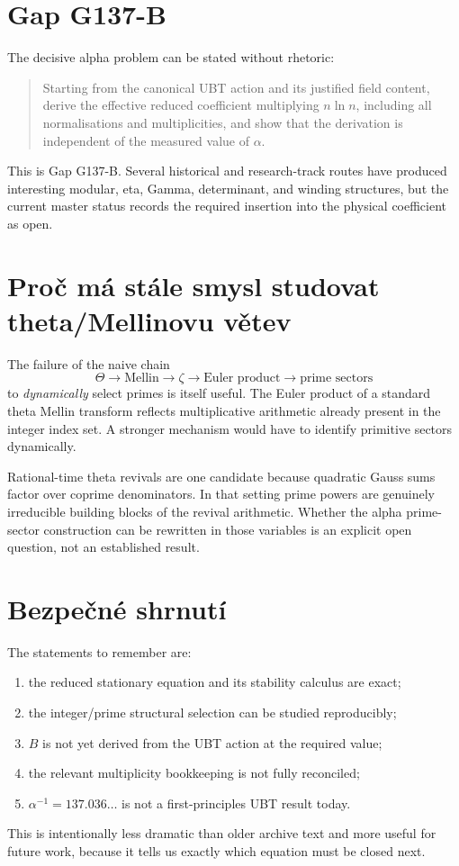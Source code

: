 \section{Gap G137-B}
The decisive alpha problem can be stated without rhetoric:
\begin{quote}
Starting from the canonical UBT action and its justified field content, derive
the effective reduced coefficient multiplying $n\ln n$, including all
normalisations and multiplicities, and show that the derivation is independent
of the measured value of $\alpha$.
\end{quote}
This is Gap G137-B.  Several historical and research-track routes have produced
interesting modular, eta, Gamma, determinant, and winding structures, but the
current master status records the required insertion into the physical
coefficient as open.

\section{Proč má stále smysl studovat theta/Mellinovu větev}
The failure of the naive chain
\[
 \Theta\to\text{Mellin}\to\zeta\to\text{Euler product}
 \to\text{prime sectors}
\]
to \emph{dynamically} select primes is itself useful.  The Euler product of a
standard theta Mellin transform reflects multiplicative arithmetic already
present in the integer index set.  A stronger mechanism would have to identify
primitive sectors dynamically.

Rational-time theta revivals are one candidate because quadratic Gauss sums
factor over coprime denominators.  In that setting prime powers are genuinely
irreducible building blocks of the revival arithmetic.  Whether the alpha
prime-sector construction can be rewritten in those variables is an explicit
open question, not an established result.

\section{Bezpečné shrnutí}
The statements to remember are:
\begin{enumerate}
 \item the reduced stationary equation and its stability calculus are exact;
 \item the integer/prime structural selection can be studied reproducibly;
 \item $B$ is not yet derived from the UBT action at the required value;
 \item the relevant multiplicity bookkeeping is not fully reconciled;
 \item $\alpha^{-1}=137.036\ldots$ is not a first-principles UBT result today.
\end{enumerate}
This is intentionally less dramatic than older archive text and more useful for
future work, because it tells us exactly which equation must be closed next.
